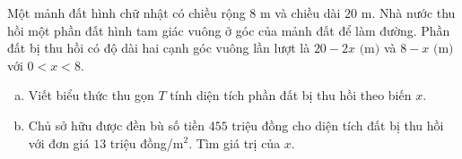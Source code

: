 \begin{bt}%
Một mảnh đất hình chữ nhật có chiều rộng $8\text{ m}$ và chiều dài $20\text{ m}$. Nhà nước thu hồi một phần đất hình tam giác vuông ở góc của mảnh đất để làm đường. Phần đất bị thu hồi có độ dài hai cạnh góc vuông lần lượt là $20 - 2x\text{ (m)}$ và $8 - x\text{ (m)}$ với $0 < x < 8$.
	\begin{enumerate}[a)]
		\item Viết biểu thức thu gọn $T$ tính diện tích phần đất bị thu hồi theo biến $x$.
		\item Chủ sở hữu được đền bù số tiền $455$ triệu đồng cho diện tích đất bị thu hồi với đơn giá $13$ triệu đồng/$\text{m}^2$. Tìm giá trị của $x$.
	\end{enumerate}
\end{bt}


